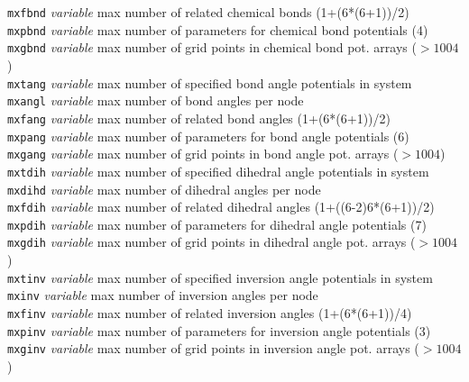 \begin{tabbing}
\> {\tt mxfbnd}      \> {\em variable}       \> max number of related chemical bonds (1+(6*(6+1))/2) \\
\> {\tt mxpbnd}      \> {\em variable}       \> max number of parameters for chemical bond potentials (4) \\
\> {\tt mxgbnd}      \> {\em variable}       \> max number of grid points in chemical bond pot. arrays ($> 1004$) \\
\> {\tt mxtang}      \> {\em variable}       \> max number of specified bond angle potentials in system \\
\> {\tt mxangl}      \> {\em variable}       \> max number of bond angles per node \\
\> {\tt mxfang}      \> {\em variable}       \> max number of related bond angles (1+(6*(6+1))/2) \\
\> {\tt mxpang}      \> {\em variable}       \> max number of parameters for bond angle potentials (6) \\
\> {\tt mxgang}      \> {\em variable}       \> max number of grid points in bond angle pot. arrays ($> 1004$) \\
\> {\tt mxtdih}      \> {\em variable}       \> max number of specified dihedral angle potentials in system \\
\> {\tt mxdihd}      \> {\em variable}       \> max number of dihedral angles per node \\
\> {\tt mxfdih}      \> {\em variable}       \> max number of related dihedral angles (1+((6-2)6*(6+1))/2) \\
\> {\tt mxpdih}      \> {\em variable}       \> max number of parameters for dihedral angle potentials (7) \\
\> {\tt mxgdih}      \> {\em variable}       \> max number of grid points in dihedral angle pot. arrays ($> 1004$) \\
\> {\tt mxtinv}      \> {\em variable}       \> max number of specified inversion angle potentials in system \\
\> {\tt mxinv}       \> {\em variable}       \> max number of inversion angles per node \\
\> {\tt mxfinv}      \> {\em variable}       \> max number of related inversion angles (1+(6*(6+1))/4) \\
\> {\tt mxpinv}      \> {\em variable}       \> max number of parameters for inversion angle potentials (3) \\
\> {\tt mxginv}      \> {\em variable}       \> max number of grid points in inversion angle pot. arrays ($> 1004$) \\

\end{tabbing}
